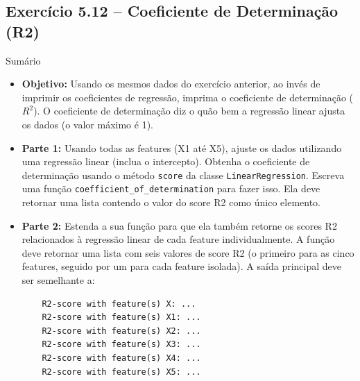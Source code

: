 \documentclass[11pt,a4paper]{article}
\begin{document}
\subsection*{Exercício 5.12 -- Coeficiente de Determinação (R2)}
\begin{exercicio}{Sumário}
\begin{itemize}
    \item \textbf{Objetivo:} Usando os mesmos dados do exercício anterior, ao invés de imprimir os coeficientes de regressão, imprima o coeficiente de determinação ($R^2$). O coeficiente de determinação diz o quão bem a regressão linear ajusta os dados (o valor máximo é 1).
    \item \textbf{Parte 1:} Usando todas as features (X1 até X5), ajuste os dados utilizando uma regressão linear (inclua o intercepto). Obtenha o coeficiente de determinação usando o método \texttt{score} da classe \texttt{LinearRegression}. Escreva uma função \texttt{coefficient\_of\_determination} para fazer isso. Ela deve retornar uma lista contendo o valor do score R2 como único elemento.
    \item \textbf{Parte 2:} Estenda a sua função para que ela também retorne os scores R2 relacionados à regressão linear de cada feature individualmente. A função deve retornar uma lista com seis valores de score R2 (o primeiro para as cinco features, seguido por um para cada feature isolada). A saída principal deve ser semelhante a:
    \begin{verbatim}
    R2-score with feature(s) X: ...
    R2-score with feature(s) X1: ...
    R2-score with feature(s) X2: ...
    R2-score with feature(s) X3: ...
    R2-score with feature(s) X4: ...
    R2-score with feature(s) X5: ...
    \end{verbatim}
\end{itemize}
\end{exercicio}
\end{document}
